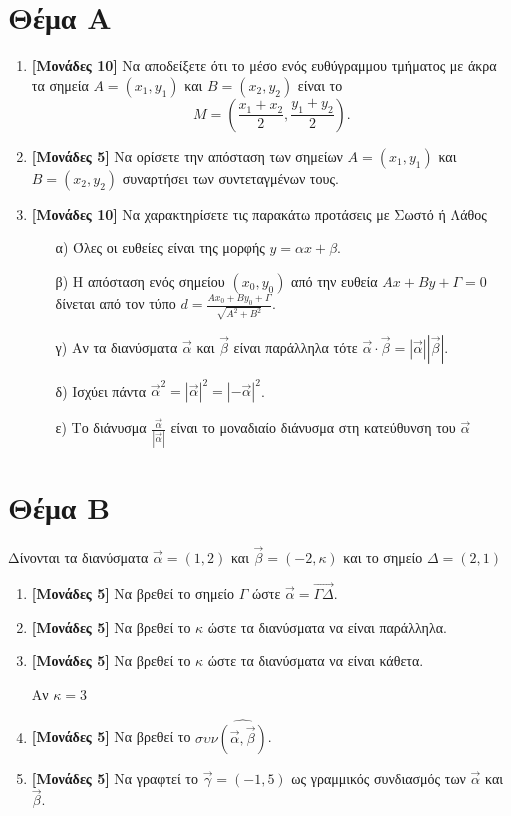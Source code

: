 \documentclass[12pt]{article}
\begin{document}
\section*{Θέμα Α}
  \noindent
  \begin{enumerate}
    \item \textbf{[Μονάδες 10]} Να αποδείξετε ότι το μέσο ενός ευθύγραμμου τμήματος με άκρα τα σημεία $Α=(x_1,y_1)$ και $Β=(x_2,y_2)$ είναι το
    $$Μ=(\frac{x_1+x_2}{2},\frac{y_1+y_2}{2}) \text{.}$$
    \item \textbf{[Μονάδες 5]} Να ορίσετε την απόσταση των σημείων $Α=(x_1,y_1)$ και $Β=(x_2,y_2)$ συναρτήσει των συντεταγμένων τους.
    \item \textbf{[Μονάδες 10]} Να χαρακτηρίσετε τις παρακάτω προτάσεις με Σωστό ή Λάθος
    \begin{enumerate}
      \item [α)] Όλες οι ευθείες είναι της μορφής $y=αx+β$.
      \item [β)] Η απόσταση ενός σημείου $(x_0,y_0)$ από την ευθεία $Αx+Βy+Γ=0$ δίνεται από τον τύπο $d=\frac{Αx_0+Βy_0+Γ}{\sqrt{Α^2+Β^2}}$.
      \item [γ)] Αν τα διανύσματα $\vec{α}$ και $\vec{β}$ είναι παράλληλα τότε $\vec{α}\cdot\vec{β}=|\vec{α}||\vec{β}|$.
      \item [δ)] Ισχύει πάντα $\vec{α}^2=|\vec{α}|^2=|-\vec{α}|^2$.
      \item [ε)] Το διάνυσμα $\frac{\vec{α}}{|\vec{α}|}$ είναι το μοναδιαίο διάνυσμα στη κατεύθυνση του $\vec{α}$
    \end{enumerate}
  \end{enumerate}

\section*{Θέμα Β}
  \noindent
  Δίνονται τα διανύσματα $\vec{α}=(1,2)$ και $\vec{β}=(-2,κ)$ και το σημείο $Δ=(2,1)$
  \begin{enumerate}
    \item \textbf{[Μονάδες 5]} Να βρεθεί το σημείο $Γ$ ώστε $\vec{α}=\overrightarrow{ΓΔ}$.
    \item \textbf{[Μονάδες 5]} Να βρεθεί το $κ$ ώστε τα διανύσματα να είναι παράλληλα.
    \item \textbf{[Μονάδες 5]} Να βρεθεί το $κ$ ώστε τα διανύσματα να είναι κάθετα.

    Αν $κ=3$
    \item \textbf{[Μονάδες 5]} Να βρεθεί το $συν\widehat{(\vec{α},\vec{β})}$.
    \item \textbf{[Μονάδες 5]} Να γραφτεί το $\vec{γ}=(-1,5)$ ως γραμμικός συνδιασμός των $\vec{α}$ και $\vec{β}$.

  \end{enumerate}
\end{document}
